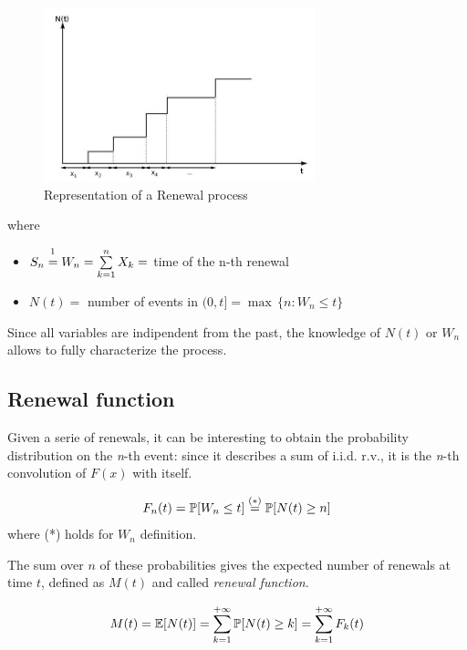 	\begin{figure}
		\centering
		\includegraphics[width=0.7\textwidth]{img/renewal.jpg}
		\caption{Representation of a Renewal process}
	\end{figure}

	where
	\begin{itemize}
		\item $ S_n \stackrel{\footnotemark}{=} W_n = \sum\limits_{k=1}^n X_k =$ time of the n-th renewal
		\item $ N(t) = $ number of events in $(0, t] = \max\,\{n : W_n \le t \}$
	\end{itemize}


	Since all variables are indipendent from the past, the knowledge of $N(t)$ or $W_n$ allows to fully characterize the process.

\subsection{Renewal function}
	Given a serie of renewals, it can be interesting to obtain the probability distribution on the \emph{n}-th event: since it describes a sum of i.i.d. r.v., it is the \emph{n}-th convolution of $F(x)$ with itself.

	\begin{equation}
		F_n(t) = \mathbb{P}[W_n \le t] \stackrel{(*)}{=} \mathbb{P}[N(t) \ge n]
	\end{equation}
	where (*) holds for $W_n$ definition.

		\begin{definition}
			The sum over $n$ of these probabilities gives the expected number of renewals at time $t$, defined as $M(t)$ and called \emph{renewal function}.

			\begin{equation}
				M(t) = \mathbb{E}[N(t)] = \sum\limits_{k=1}^{+\infty}\mathbb{P}[N(t)\ge k] = \sum\limits_{k=1}^{+\infty} F_k(t)
			\end{equation}
		\end{definition}

